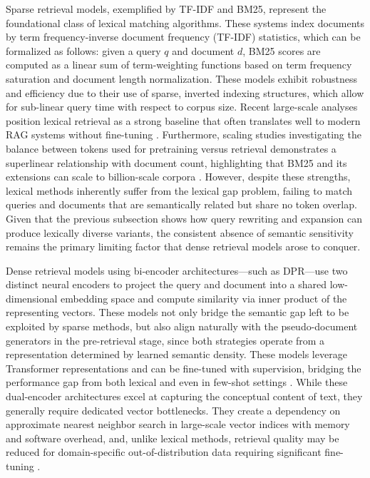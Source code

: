 \documentclass[11pt,a4paper]{article}
\begin{document}
Sparse retrieval models, exemplified by TF-IDF and BM25, represent the foundational class of lexical matching algorithms. These systems index documents by term frequency-inverse document frequency (TF-IDF) statistics, which can be formalized as follows: given a query \(q\) and document \(d\), BM25 scores are computed as a linear sum of term-weighting functions based on term frequency saturation and document length normalization. These models exhibit robustness and efficiency due to their use of sparse, inverted indexing structures, which allow for sub-linear query time with respect to corpus size. Recent large-scale analyses position lexical retrieval as a strong baseline that often translates well to modern RAG systems without fine-tuning \cite{arxiv:2508.06401v3}. Furthermore, scaling studies investigating the balance between tokens used for pretraining versus retrieval demonstrates a superlinear relationship with document count, highlighting that BM25 and its extensions can scale to billion-scale corpora \cite{arxiv:2604.00715v1}. However, despite these strengths, lexical methods inherently suffer from the lexical gap problem, failing to match queries and documents that are semantically related but share no token overlap. Given that the previous subsection shows how query rewriting and expansion can produce lexically diverse variants, the consistent absence of semantic sensitivity remains the primary limiting factor that dense retrieval models arose to conquer.

Dense retrieval models using bi-encoder architectures---such as DPR---use two distinct neural encoders to project the query and document into a shared low-dimensional embedding space and compute similarity via inner product of the representing vectors. These models not only bridge the semantic gap left to be exploited by sparse methods, but also align naturally with the pseudo-document generators in the pre-retrieval stage, since both strategies operate from a representation determined by learned semantic density. These models leverage Transformer representations and can be fine-tuned with supervision, bridging the performance gap from both lexical and even in few-shot settings \cite{arxiv:2401.14887v3}. While these dual-encoder architectures excel at capturing the conceptual content of text, they generally require dedicated vector bottlenecks. They create a dependency on approximate nearest neighbor search in large-scale vector indices with memory and software overhead, and, unlike lexical methods, retrieval quality may be reduced for domain-specific out-of-distribution data requiring significant fine-tuning \cite{arxiv:2312.05934v3}.
\end{document}

